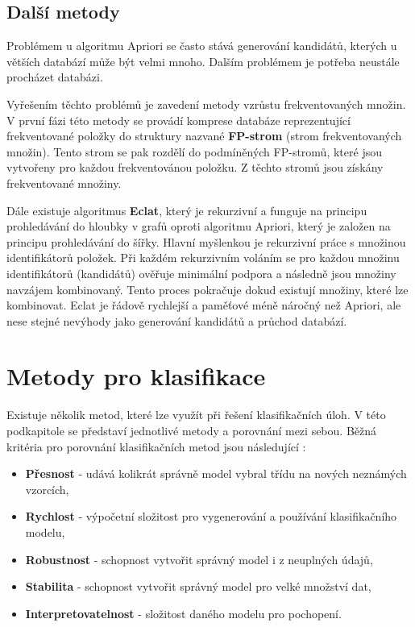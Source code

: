 \subsection*{Další metody}
Problémem u algoritmu Apriori se často stává generování kandidátů, kterých u větších databází může být velmi mnoho. Dalším problémem je potřeba neustále procházet databázi.

Vyřešením těchto problémů je zavedení metody vzrůstu frekventovaných množin. V první fázi této metody se provádí komprese databáze reprezentující frekventované položky do struktury nazvané \textbf{FP-strom} (strom frekventovaných množin). Tento strom se pak rozdělí do podmíněných FP-stromů, které jsou vytvořeny pro každou frekventovánou položku. Z těchto stromů jsou získány frekventované množiny. \cite{Han}

Dále existuje algoritmus \textbf{Eclat}, který je rekurzivní a funguje na principu prohledávání do hloubky v grafů oproti algoritmu Apriori, který je založen na principu prohledávání do šířky. Hlavní myšlenkou je rekurzivní práce s množinou identifikátorů položek. Při každém rekurzivním  voláním se pro každou množinu identifikátorů (kandidátů) ověřuje minimální podpora a následně jsou množiny navzájem kombinovaný. Tento proces pokračuje dokud existují množiny, které lze kombinovat. Eclat je řádově rychlejší a paměťové méně náročný než Apriori, ale nese stejné nevýhody jako generování kandidátů a průchod databází. \cite{Heaton}

\section{Metody pro klasifikace}
Existuje několik metod, které lze využít při řešení klasifikačních úloh. V této podkapitole se představí jednotlivé metody a porovnání mezi sebou.  Běžná kritéria pro porovnání klasifikačních metod jsou následující \cite{Han}:


\begin{itemize}
    \item \textbf{Přesnost} - udává kolikrát správně model vybral třídu na nových neznámých vzorcích,
    \item \textbf{Rychlost} - výpočetní složitost pro vygenerování a používání klasifikačního modelu,
    \item \textbf{Robustnost} - schopnost vytvořit správný model i z neuplných údajů,
    \item \textbf{Stabilita} - schopnost vytvořit správný model pro velké množství dat,
    \item \textbf{Interpretovatelnost} - složitost daného modelu pro pochopení.
\end{itemize}

